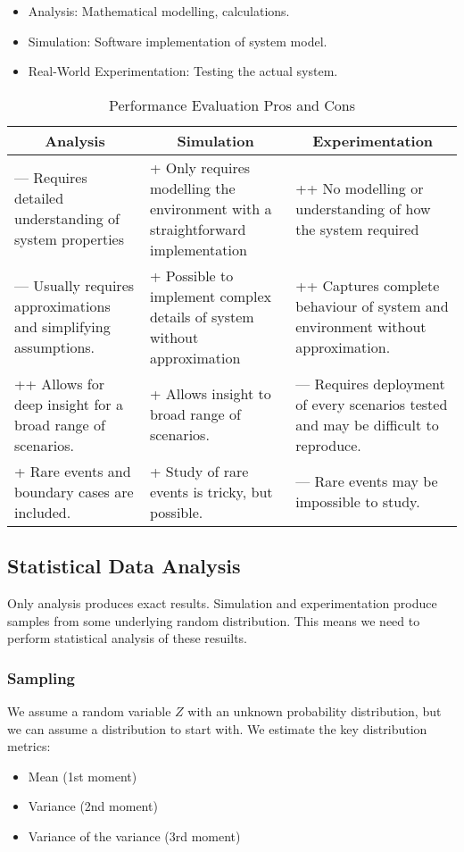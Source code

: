 \begin{itemize}[noitemsep]
\item Analysis: Mathematical modelling, calculations.
\item Simulation: Software implementation of system model.
\item Real-World Experimentation: Testing the actual system.
\end{itemize}

\begin{table}[h!]
  \centering
  \begin{tabular}{p{6cm}p{6cm}p{6cm}}
    \toprule
    \multicolumn{1}{c}{\textbf{Analysis}} & \multicolumn{1}{c}{\textbf{Simulation}} & \multicolumn{1}{c}{\textbf{Experimentation}} \\
    \midrule
    --- Requires detailed understanding of system properties & + Only requires modelling the environment with a straightforward implementation & ++ No modelling or understanding of how the system required \\
    \midrule
    --- Usually requires approximations and simplifying assumptions. & + Possible to implement complex details of system without approximation & ++ Captures complete behaviour of system and environment without approximation. \\
    \midrule
    ++ Allows for deep insight for a broad range of scenarios. & + Allows insight to broad range of scenarios. & --- Requires deployment of every scenarios tested and may be difficult to reproduce. \\
    \midrule
    + Rare events and boundary cases are included. & + Study of rare events is tricky, but possible. & --- Rare events may be impossible to study. \\
    \bottomrule
  \end{tabular}
  \caption{Performance Evaluation Pros and Cons}
  \label{tab:Performance_Evaluation_Pros_Cons}
\end{table}

\subsection{Statistical Data Analysis}\label{subsec:Statistical_Data_Analysis}
Only analysis produces exact results.
Simulation and experimentation produce samples from some underlying random distribution.
This means we need to perform statistical analysis of these resuilts.

\subsubsection{Sampling}\label{subsubsec:Sampling}
We assume a random variable $Z$ with an unknown probability distribution, but we can assume a distribution to start with.
We estimate the key distribution metrics:
\begin{itemize}[noitemsep]
\item Mean (1st moment)
\item Variance (2nd moment)
\item Variance of the variance (3rd moment)
\end{itemize}

